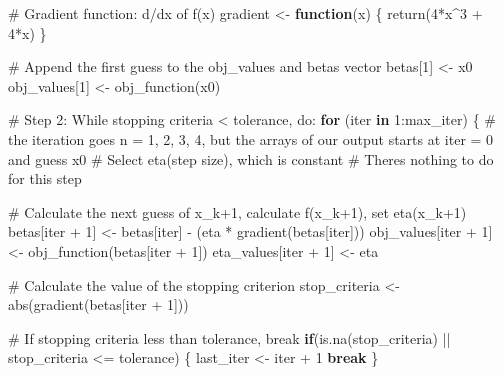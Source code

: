 \documentclass[
  letterpaper,
  DIV=11,
  numbers=noendperiod]{scrartcl}
\newenvironment{Shaded}{\begin{snugshade}}{\end{snugshade}}
\newcommand{\CommentTok}[1]{\textcolor[rgb]{0.37,0.37,0.37}{#1}}
\newcommand{\ControlFlowTok}[1]{\textcolor[rgb]{0.00,0.23,0.31}{\textbf{#1}}}
\newcommand{\DecValTok}[1]{\textcolor[rgb]{0.68,0.00,0.00}{#1}}
\newcommand{\FunctionTok}[1]{\textcolor[rgb]{0.28,0.35,0.67}{#1}}
\newcommand{\NormalTok}[1]{\textcolor[rgb]{0.00,0.23,0.31}{#1}}
\newcommand{\OtherTok}[1]{\textcolor[rgb]{0.00,0.23,0.31}{#1}}
\newcommand{\SpecialCharTok}[1]{\textcolor[rgb]{0.37,0.37,0.37}{#1}}
\begin{document}
\begin{Shaded}
\begin{Highlighting}[]
  \CommentTok{\# Gradient function: d/dx of f(x)}
\NormalTok{  gradient }\OtherTok{\textless{}{-}} \ControlFlowTok{function}\NormalTok{(x) \{}
    \FunctionTok{return}\NormalTok{(}\DecValTok{4}\SpecialCharTok{*}\NormalTok{x}\SpecialCharTok{\^{}}\DecValTok{3} \SpecialCharTok{+} \DecValTok{4}\SpecialCharTok{*}\NormalTok{x)}
\NormalTok{  \}}
  
  \CommentTok{\# Append the first guess to the obj\_values and betas vector}
\NormalTok{  betas[}\DecValTok{1}\NormalTok{] }\OtherTok{\textless{}{-}}\NormalTok{ x0}
\NormalTok{  obj\_values[}\DecValTok{1}\NormalTok{] }\OtherTok{\textless{}{-}} \FunctionTok{obj\_function}\NormalTok{(x0)}
  
  \CommentTok{\# Step 2: While stopping criteria \textless{} tolerance, do:}
  \ControlFlowTok{for}\NormalTok{ (iter }\ControlFlowTok{in} \DecValTok{1}\SpecialCharTok{:}\NormalTok{max\_iter) \{ }\CommentTok{\# the iteration goes n = 1, 2, 3, 4, but the arrays of our output starts at iter = 0 and guess x0}
    \CommentTok{\# Select eta(step size), which is constant}
    \CommentTok{\# There\textquotesingle{}s nothing to do for this step}
    
    \CommentTok{\# Calculate the next guess of x\_k+1, calculate f(x\_k+1), set eta(x\_k+1)}
\NormalTok{    betas[iter }\SpecialCharTok{+} \DecValTok{1}\NormalTok{] }\OtherTok{\textless{}{-}}\NormalTok{ betas[iter] }\SpecialCharTok{{-}}\NormalTok{ (eta }\SpecialCharTok{*} \FunctionTok{gradient}\NormalTok{(betas[iter]))}
\NormalTok{    obj\_values[iter }\SpecialCharTok{+} \DecValTok{1}\NormalTok{] }\OtherTok{\textless{}{-}} \FunctionTok{obj\_function}\NormalTok{(betas[iter }\SpecialCharTok{+} \DecValTok{1}\NormalTok{])}
\NormalTok{    eta\_values[iter }\SpecialCharTok{+} \DecValTok{1}\NormalTok{] }\OtherTok{\textless{}{-}}\NormalTok{ eta}
    
    \CommentTok{\# Calculate the value of the stopping criterion}
\NormalTok{    stop\_criteria }\OtherTok{\textless{}{-}} \FunctionTok{abs}\NormalTok{(}\FunctionTok{gradient}\NormalTok{(betas[iter }\SpecialCharTok{+} \DecValTok{1}\NormalTok{]))}
    
    \CommentTok{\# If stopping criteria less than tolerance, break}
    \ControlFlowTok{if}\NormalTok{(}\FunctionTok{is.na}\NormalTok{(stop\_criteria) }\SpecialCharTok{||}\NormalTok{ stop\_criteria }\SpecialCharTok{\textless{}=}\NormalTok{ tolerance) \{ }
\NormalTok{      last\_iter }\OtherTok{\textless{}{-}}\NormalTok{ iter }\SpecialCharTok{+} \DecValTok{1}
      \ControlFlowTok{break} 
\NormalTok{    \}}
    

\end{Highlighting}
\end{Shaded}
\end{document}
